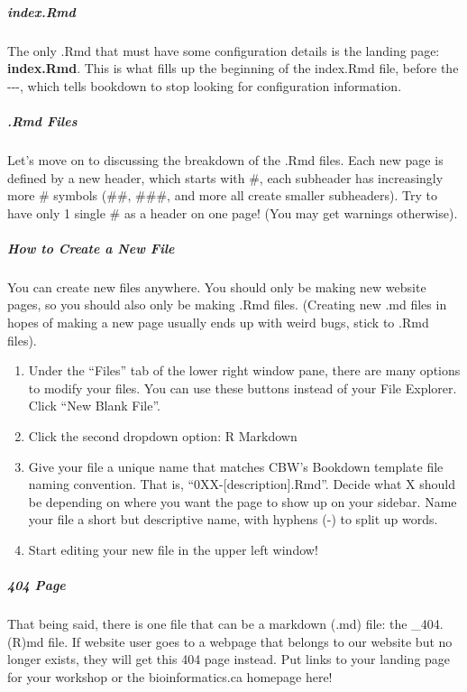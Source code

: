 \documentclass[
]{book}
\providecommand{\tightlist}{%
  \setlength{\itemsep}{0pt}\setlength{\parskip}{0pt}}
\theoremstyle{definition}
\theoremstyle{definition}
\theoremstyle{definition}
\theoremstyle{definition}
\theoremstyle{remark}
\begin{document}
\subparagraph*{index.Rmd}\label{index.rmd}

The only .Rmd that must have some configuration details is the landing page: \textbf{index.Rmd}. This is what fills up the beginning of the index.Rmd file, before the -\/-\/-, which tells bookdown to stop looking for configuration information.

\subparagraph*{.Rmd Files}\label{rmd-files}

Let's move on to discussing the breakdown of the .Rmd files. Each new page is defined by a new header, which starts with \#, each subheader has increasingly more \# symbols (\#\#, \#\#\#, and more all create smaller subheaders). Try to have only 1 single \# as a header on one page! (You may get warnings otherwise).

\subparagraph*{How to Create a New File}\label{how-to-create-a-new-file}

You can create new files anywhere. You should only be making new website pages, so you should also only be making .Rmd files. (Creating new .md files in hopes of making a new page usually ends up with weird bugs, stick to .Rmd files).

\begin{enumerate}
\def\labelenumi{\arabic{enumi}.}
\tightlist
\item
  Under the ``Files'' tab of the lower right window pane, there are many options to modify your files. You can use these buttons instead of your File Explorer. Click ``New Blank File''.
\item
  Click the second dropdown option: R Markdown
\item
  Give your file a unique name that matches CBW's Bookdown template file naming convention. That is, ``0XX-{[}description{]}.Rmd''. Decide what X should be depending on where you want the page to show up on your sidebar. Name your file a short but descriptive name, with hyphens (-) to split up words.
\item
  Start editing your new file in the upper left window!
\end{enumerate}

\subparagraph*{404 Page}\label{page}

That being said, there is one file that can be a markdown (.md) file: the \_404.(R)md file. If website user goes to a webpage that belongs to our website but no longer exists, they will get this 404 page instead. Put links to your landing page for your workshop or the bioinformatics.ca homepage here!
\end{document}
